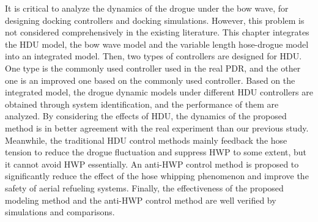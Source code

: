 It is critical to analyze the dynamics of the drogue under the bow
wave, for designing docking controllers and docking simulations. However,
this problem is not considered comprehensively in the existing literature.
This chapter integrates the HDU model, the bow wave model and the variable
length hose-drogue model into an integrated model. Then, two types
of controllers are designed for HDU. One type is the commonly used
controller used in the real PDR, and the other one is an improved
one based on the commonly used controller. Based on the integrated
model, the drogue dynamic models under different HDU controllers are
obtained through system identification, and the performance of them
are analyzed. By considering the effects of HDU, the dynamics of the
proposed method is in better agreement with the real experiment than
our previous study. Meanwhile, the traditional HDU control methods
mainly feedback the hose tension to reduce the drogue fluctuation
and suppress HWP to some extent, but it cannot avoid HWP essentially.
An anti-HWP control method is proposed to significantly reduce the
effect of the hose whipping phenomenon and improve the safety of aerial
refueling systems. Finally, the effectiveness of the proposed modeling
method and the anti-HWP control method are well verified by simulations
and comparisons.